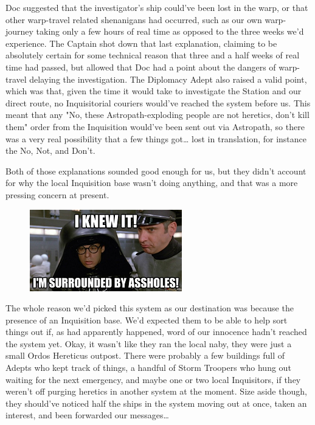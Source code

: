 Doc suggested that the investigator's ship could've been lost in the warp, or that other warp-travel related shenanigans had occurred, such as our own warp-journey taking only a few hours of real time as opposed to the three weeks we'd experience. 
The Captain shot down that last explanation, claiming to be absolutely certain for some technical reason that three and a half weeks of real time had passed, but allowed that Doc had a point about the dangers of warp-travel delaying the investigation. 
The Diplomacy Adept also raised a valid point, which was that, given the time it would take to investigate the Station and our direct route, no Inquisitorial couriers would've reached the system before us. 
This meant that any "No, these Astropath-exploding people are not heretics, don't kill them" order from the Inquisition would've been sent out via Astropath, so there was a very real possibility that a few things got… lost in translation, for instance the No, Not, and Don't.

Both of those explanations sounded good enough for us, but they didn't account for why the local Inquisition base wasn't doing anything, and that was a more pressing concern at present.

\begin{figure}
	\begin{center}
		\includegraphics[width=\figwidth]{pics/15/27.png}
	\end{center}
\end{figure}
The whole reason we'd picked this system as our destination was because the presence of an Inquisition base. 
We'd expected them to be able to help sort things out if, as had apparently happened, word of our innocence hadn't reached the system yet. 
Okay, it wasn't like they ran the local naby, they were just a small Ordos Hereticus outpost. 
There were probably a few buildings full of Adepts who kept track of things, a handful of Storm Troopers who hung out waiting for the next emergency, and maybe one or two local Inquisitors, if they weren't off purging heretics in another system at the moment. 
Size aside though, they should've noticed half the ships in the system moving out at once, taken an interest, and been forwarded our messages…

